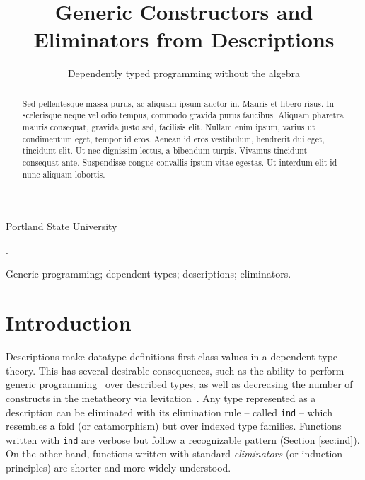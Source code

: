 \documentclass[preprint,nonatbib]{sigplanconf}
\newcommand{\refsec}[1]{Section \ref{sec:#1}}
\begin{document}
\setlength{\pdfpageheight}{\paperheight}
\setlength{\pdfpagewidth}{\paperwidth}


\title{Generic Constructors and Eliminators from Descriptions}
\subtitle{Dependently typed programming without the algebra}

           {Portland State University}

\maketitle

\begin{abstract}
Sed pellentesque massa purus, ac aliquam ipsum auctor in. Mauris et
libero risus. In scelerisque neque vel odio tempus, commodo gravida
purus faucibus. Aliquam pharetra mauris consequat, gravida justo sed,
facilisis elit. Nullam enim ipsum, varius ut condimentum eget, tempor
id eros. Aenean id eros vestibulum, hendrerit dui eget, tincidunt
elit. Ut nec dignissim lectus, a bibendum turpis. Vivamus tincidunt
consequat ante. Suspendisse congue convallis ipsum vitae egestas. Ut
interdum elit id nunc aliquam lobortis.
\end{abstract}

.

\keywords
Generic programming; dependent types; descriptions; eliminators.

\section{Introduction}
\label{sec:intro}

Descriptions make datatype definitions first class values in a
dependent type theory. This has several desirable consequences, such as the
ability to perform generic programming~\citep{Chapman:2010:GAL:1932681.1863547,mcbride2010ornamental,dagand:phd}
over described types, as well as decreasing the number of constructs in the
metatheory via levitation~\citep{Chapman:2010:GAL:1932681.1863547,dagand:phd}. 
Any type represented as a description can
be eliminated with its elimination rule -- called {\tt ind} -- which resembles a fold (or catamorphism) but
over indexed type families. Functions written with {\tt ind} are
verbose but follow a recognizable pattern (\refsec{ind}). 
On the other hand, functions written with standard {\it eliminators} (or
induction principles) are shorter and more widely understood.
\end{document}
